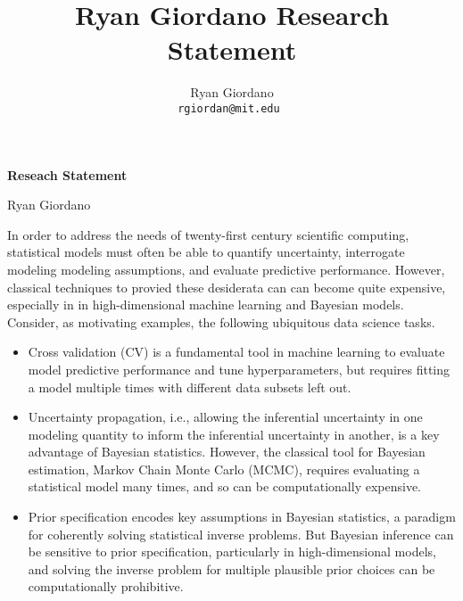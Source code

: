 
\usepackage{enumitem}

\title{Ryan Giordano Research Statement}

\author{
  Ryan Giordano \\ \texttt{rgiordan@mit.edu }
}



\begin{minipage}[t]{0.5\textwidth}
\hspace{-2em} %
{\bf \LARGE Reseach Statement}\\
\end{minipage}
\begin{minipage}[t]{0.5\textwidth}
        \hspace{4.5em} %
        {\LARGE Ryan Giordano}
\end{minipage}



In order to address the needs of twenty-first century scientific computing,
statistical models must often be able to quantify uncertainty, interrogate
modeling modeling assumptions, and evaluate predictive performance. However,
classical techniques to provied these desiderata can can become quite expensive,
especially in in high-dimensional machine learning and Bayesian models.
Consider, as motivating examples, the following ubiquitous data science tasks.
%
\begin{itemize}
%
        \item Cross validation (CV) is a fundamental tool in machine learning to
        evaluate model predictive performance and tune hyperparameters, but
        requires fitting a model multiple times with different data subsets left
        out.

        \item Uncertainty propagation, i.e., allowing the inferential
        uncertainty in one modeling quantity to inform the inferential
        uncertainty in another, is a key advantage of Bayesian statistics.
        However, the classical tool for Bayesian estimation, Markov Chain Monte
        Carlo (MCMC), requires evaluating a statistical model many times, and so
        can be computationally expensive.

        \item  Prior specification encodes key assumptions in Bayesian
        statistics, a paradigm for coherently solving statistical
        inverse problems.  But Bayesian inference can be sensitive to prior
        specification, particularly in high-dimensional models, and solving the
        inverse problem for multiple plausible prior choices can be
        computationally prohibitive.
%
\end{itemize}
%

